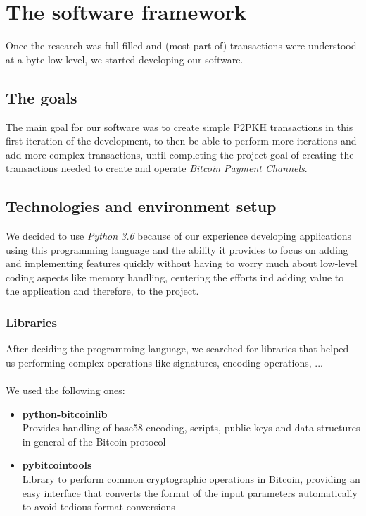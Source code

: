 \chapter*{The software framework}
\label{chap:software_framework}
Once the research was full-filled and (most part of) transactions were understood at a byte low-level, we started developing our software. 
\section{The goals}
The main goal for our software was to create simple P2PKH transactions in this first iteration of the development, to then be able to perform more iterations and add more complex transactions, until completing the project goal of creating the transactions needed to create and operate \textit{Bitcoin Payment Channels}.
\section{Technologies and environment setup}
We decided to use \textit{Python 3.6} because of our experience developing applications using this programming language and the ability it provides to focus on adding and implementing features quickly without having to worry much about low-level coding aspects like memory handling, centering the efforts ind adding value to the application and therefore, to the project.

\subsection{Libraries}
After deciding the programming language, we searched for libraries that helped us performing complex operations like signatures, encoding operations, ...\\\\
We used the following ones:
\begin{itemize}
    \item \textbf{python-bitcoinlib\cite{python-bitcoinlib:online}}\\
    Provides handling of base58 encoding, scripts, public keys and data structures in general of the Bitcoin protocol
    \item \textbf{pybitcointools\cite{pybitcointools:online}}\\
    Library to perform common cryptographic operations in Bitcoin, providing an easy interface that converts the format of the input parameters automatically to avoid tedious format conversions
\end{itemize}

